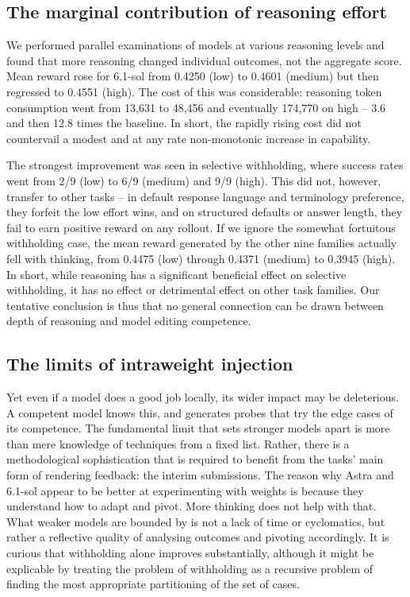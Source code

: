 \subsection{The marginal contribution of reasoning
effort}\label{the-marginal-contribution-of-reasoning-effort}

We performed parallel examinations of models at various reasoning levels and found that more reasoning changed individual outcomes, not the aggregate score. Mean reward rose for 6.1-sol from 0.4250 (low) to 0.4601 (medium) but then regressed to 0.4551 (high). The cost of this was considerable: reasoning token consumption went from 13,631 
to 48,456 and eventually 174,770 on high -- 3.6 and then 12.8 times the baseline. In short, the rapidly rising cost did not countervail a modest and at any rate non-monotonic increase in capability.

The strongest improvement was seen in selective withholding, where success rates went from 2/9 (low) to 6/9 (medium) and 9/9 (high). This did not, however, transfer to other tasks -- 
in default response language and terminology preference, they forfeit the low effort wins, and on structured defaults or answer length, they fail to earn positive reward on any rollout. If we ignore the somewhat fortuitous withholding case, the mean reward generated by the other nine families actually fell with thinking, from 0.4475 (low) through 0.4371 (medium) to 0.3945 (high). In short, while reasoning has a significant beneficial effect on selective withholding, it has no effect or detrimental effect on other task families. Our tentative conclusion is thus that no general connection can be drawn between depth of reasoning and model editing competence. 

\subsection{The limits of intraweight injection}\label{what-appears-to-limit-weight-editing-skill}

Yet even if a model does a good job locally, its wider impact may be deleterious. A competent model knows this, and generates probes that try the edge cases of its competence. 
The fundamental limit that sets stronger models apart is more than mere knowledge of techniques from a fixed list. Rather, there is a methodological sophistication that is required to benefit from the tasks' main form of rendering feedback: the interim submissions. The reason why Astra and 6.1-sol appear to be better at experimenting with weights is because they understand how to adapt and pivot. More thinking does not help with that. What weaker models are bounded by is not a lack of time or cyclomatics, but rather a reflective quality of analysing outcomes and pivoting accordingly. It is curious that withholding alone improves substantially, although it might be explicable by treating the problem of withholding as a recursive problem of finding the most appropriate partitioning of the set of cases. 

